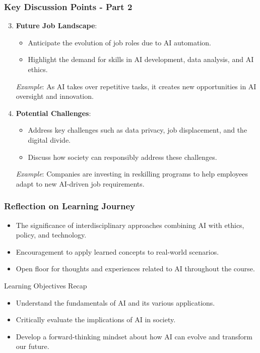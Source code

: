 \documentclass{beamer}
\begin{document}
\begin{frame}[fragile]
    \frametitle{Key Discussion Points - Part 2}
    \begin{enumerate}
        \setcounter{enumi}{2}
        \item \textbf{Future Job Landscape}:
            \begin{itemize}
                \item Anticipate the evolution of job roles due to AI automation.
                \item Highlight the demand for skills in AI development, data analysis, and AI ethics.
            \end{itemize}
            \textit{Example}: As AI takes over repetitive tasks, it creates new opportunities in AI oversight and innovation.
        \item \textbf{Potential Challenges}:
            \begin{itemize}
                \item Address key challenges such as data privacy, job displacement, and the digital divide.
                \item Discuss how society can responsibly address these challenges.
            \end{itemize}
            \textit{Example}: Companies are investing in reskilling programs to help employees adapt to new AI-driven job requirements.
    \end{enumerate}
\end{frame}

\begin{frame}[fragile]
    \frametitle{Reflection on Learning Journey}
    \begin{itemize}
        \item The significance of interdisciplinary approaches combining AI with ethics, policy, and technology.
        \item Encouragement to apply learned concepts to real-world scenarios.
        \item Open floor for thoughts and experiences related to AI throughout the course.
    \end{itemize}

    \begin{block}{Learning Objectives Recap}
        \begin{itemize}
            \item Understand the fundamentals of AI and its various applications.
            \item Critically evaluate the implications of AI in society.
            \item Develop a forward-thinking mindset about how AI can evolve and transform our future.
        \end{itemize}
    \end{block}
\end{frame}
\end{document}
